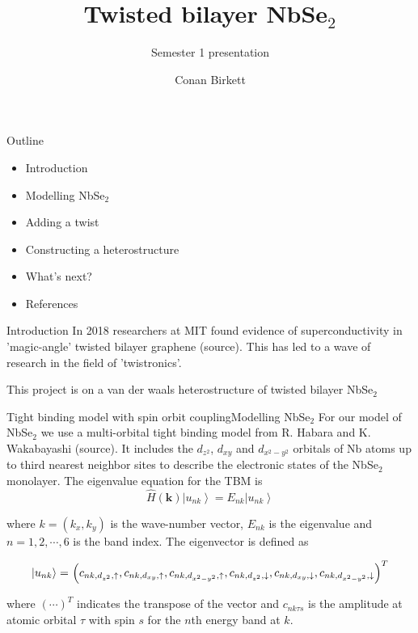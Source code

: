 \documentclass[9pt]{beamer}
\title{Twisted bilayer NbSe$_2$}
\subtitle{Semester 1 presentation}
\author{Conan Birkett}
\institute{University of Bath department of Physics}
\begin{document}
\begin{frame}
  \titlepage
\end{frame}

\begin{frame}{Outline}
  \begin{itemize}
      \item Introduction
      \item Modelling NbSe$_2$
      \item Adding a twist
      \item Constructing a heterostructure
      \item What's next?
      \item References
  \end{itemize}
\end{frame}

\begin{frame}{Introduction}
  In 2018 researchers at MIT found evidence of superconductivity in 'magic-angle' twisted bilayer graphene (source). This has led to a wave of research in the field of 'twistronics'.

  This project is on a van der waals heterostructure of twisted bilayer NbSe$_2$
\end{frame}

\begin{frame}{Tight binding model with spin orbit coupling}{Modelling NbSe$_2$}
  For our model of NbSe$_2$ we use a multi-orbital tight binding model from R. Habara and K. Wakabayashi (source). It includes the $d_{z^2}$, $d_{xy}$ and $d_{x^2-y^2}$ orbitals of Nb atoms up to third nearest neighbor sites to describe the electronic states of the NbSe$_2$ monolayer. The eigenvalue equation for the TBM is
  \begin{equation}
    \label{TBM_evalue_eqn}
    \hat{H}(\boldsymbol{k})\left|u_{n k}\right\rangle=E_{n k}\left|u_{n k}\right\rangle
  \end{equation}

  where $k=\left(k_{x}, k_{y}\right)$ is the wave-number vector, $E_{nk}$ is the eigenvalue and $n = 1,2,\cdots,6$ is the band index. The eigenvector is defined as

  \begin{equation}
    \left|u_{n k}\right\rangle=$ $\left(c_{n k, d_{z^{2}}, \uparrow}, c_{n k, d_{x y}, \uparrow}, c_{n k, d_{x^{2}-y^{2}}, \uparrow}, c_{n k, d_{z^{2}}, \downarrow}, c_{n k, d_{x y}, \downarrow}, c_{n k, d_{x^{2}-y^{2}}, \downarrow}\right)^{T}
  \end{equation}

  where $(\cdots)^T$ indicates the transpose of the vector and $c_{nk\tau s}$ is the amplitude at atomic orbital $\tau$ with spin $s$ for the $n$th energy band at $k$.
\end{frame}
\end{document}
